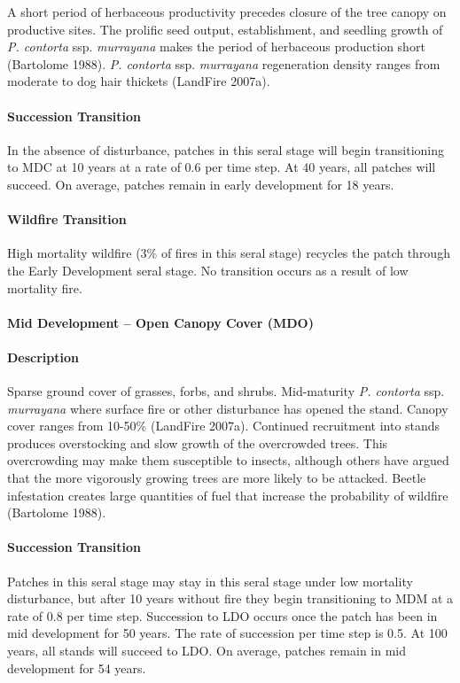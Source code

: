 A short period of herbaceous productivity precedes closure of the tree canopy on productive sites. The prolific seed output, establishment, and seedling growth of \emph{P. contorta} ssp. \emph{murrayana} makes the period of herbaceous production short (Bartolome 1988). \emph{P. contorta} ssp. \emph{murrayana} regeneration density ranges from moderate to dog hair thickets (LandFire 2007a).


\paragraph{Succession Transition} In the absence of disturbance, patches in this seral stage will begin transitioning to MDC at 10 years at a rate of 0.6 per time step. At 40 years, all patches will succeed. On average, patches remain in early development for 18 years.

\paragraph{Wildfire Transition} High mortality wildfire (3\% of fires in this seral stage) recycles the patch through the Early Development seral stage. No transition occurs as a result of low mortality fire.

\noindent\hrulefill


\paragraph{Mid Development – Open Canopy Cover (MDO)}

\paragraph{Description} Sparse ground cover of grasses, forbs, and shrubs. Mid-maturity \emph{P. contorta} ssp. \emph{murrayana} where surface fire or other disturbance has opened the stand. Canopy cover ranges from 10-50\% (LandFire 2007a).
Continued recruitment into stands produces overstocking and slow growth of the overcrowded trees. This overcrowding may make them susceptible to insects, although others have argued that the more vigorously growing trees are more likely to be attacked. Beetle infestation creates large quantities of fuel that increase the probability of wildfire (Bartolome 1988).


\paragraph{Succession Transition} Patches in this seral stage may stay in this seral stage under low mortality disturbance, but after 10 years without fire they begin transitioning to MDM at a rate of 0.8 per time step. Succession to LDO occurs once the patch has been in mid development for 50 years. The rate of succession per time step is 0.5. At 100 years, all stands will succeed to LDO. On average, patches remain in mid development for 54 years.

